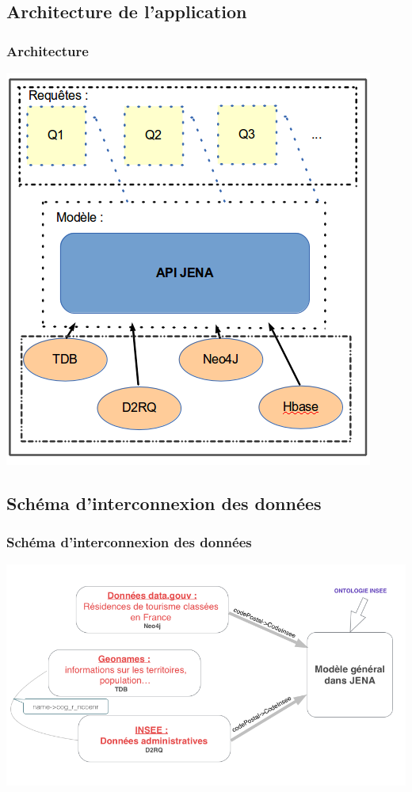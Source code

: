 \documentclass[12pt]{beamer}
\begin{document}
\subsection{Architecture de l'application}
\begin{frame}
\frametitle{Architecture}
\begin{center}
\includegraphics[scale=0.4]{archi_appli.png} 

\label{fig_appli}
\end{center}

\end{frame}
\subsection{Schéma d'interconnexion des données}

\begin{frame}
\frametitle{Schéma d'interconnexion des données}
\begin{center}
	\includegraphics[scale=0.38]{interconnexion.png} 
	
	\label{fig_interconnexion}
\end{center}

\end{frame}
\end{document}

